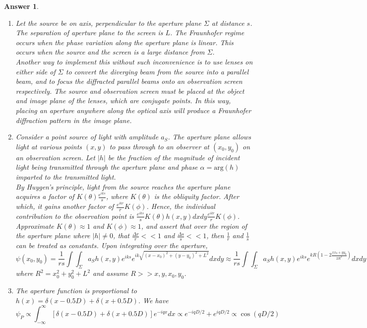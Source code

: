 \documentclass[a4paper]{article}
\newtheorem{ans}{Answer}[subsection]
\theoremstyle{new}
\begin{document}
\begin{ans}\leavevmode
\begin{enumerate}[label=(\alph*)]
\item Let the source be on axis, perpendicular to the aperture plane $\Sigma$ at distance $s$. The separation of aperture plane to the screen is $L$. The Fraunhofer regime occurs when the phase variation along the aperture plane is linear. This occurs when the source and the screen is a large distance from $\Sigma$.\\[5pt]
Another way to implement this without such inconvenience is to use lenses on either side of $\Sigma$ to convert the diverging beam from the source into a parallel beam, and to focus the diffracted parallel beams onto an observation screen respectively. The source and observation screen must be placed at the object and image plane of the lenses, which are conjugate points. In this way, placing an aperture anywhere along the optical axis will produce a Fraunhofer diffraction pattern in the image plane.
\item Consider a point source of light with amplitude $a_S$. The aperture plane allows light at various points $(x,y)$ to pass through to an observer at $(x_0,y_0)$ on an observation screen. Let $|h|$ be the fraction of the magnitude of incident light being transmitted through the aperture plane and phase $\alpha=\text{arg}(h)$ imparted to the transmitted light.\\[5pt]
By Huygen's principle, light from the source reaches the aperture plane acquires a factor of $K(\theta)\frac{e^{iks}}{s}$, where $K(\theta)$ is the obliquity factor. After which, it gains another factor of $\frac{e^{ikr}}{r}K(\phi)$. Hence, the individual contribution to the observation point is $\frac{e^{iks}}{s}K(\theta)h(x,y)dxdy\frac{e^{ikr}}{r}K(\phi)$. Approximate $K(\theta)\approx 1$ and $K(\phi)\approx 1$, and assert that over the region of the aperture plane where $|h|\neq 0$, that $\frac{\Delta r}{r}<<1$ and $\frac{\Delta s}{s}<<1$, then $\frac{1}{r}$ and $\frac{1}{s}$ can be treated as constants. Upon integrating over the aperture,
$$\psi(x_0,y_0)=\frac{1}{rs}\int\int_\Sigma a_Sh(x,y)e^{iks}e^{ik\sqrt{(x-x_0)^2+(y-y_0)^2+L^2}}dxdy\approx\frac{1}{rs}\int\int_\Sigma a_Sh(x,y)e^{iks}e^{kR(1-2\frac{xx_0+yy_0}{2R^2})}dxdy$$
where $R^2=x_0^2+y_0^2+L^2$ and assume $R>>x,y,x_0,y_0$.
\item The aperture function is proportional to $h(x)=\delta(x-0.5D)+\delta(x+0.5D)$. We have
$$\psi_P\propto\int_{-\infty}^\infty[\delta(x-0.5D)+\delta(x+0.5D)]e^{-iqx}dx\propto e^{-iqD/2}+e^{iqD/2}\propto\cos(qD/2)$$

\end{enumerate}
\end{ans}
\end{document}
